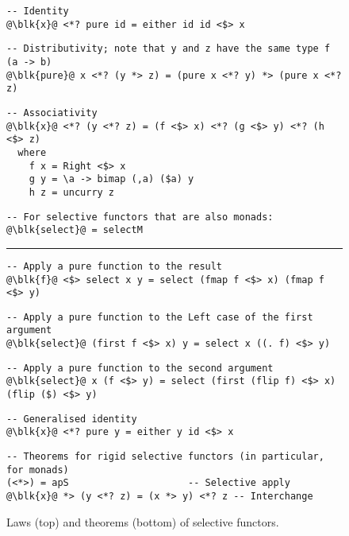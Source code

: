 {\begin{figure}
\begin{verbatim}
-- Identity
@\blk{x}@ <*? pure id = either id id <$> x
\end{verbatim}
\vspace{1mm}
\begin{verbatim}
-- Distributivity; note that y and z have the same type f (a -> b)
@\blk{pure}@ x <*? (y *> z) = (pure x <*? y) *> (pure x <*? z)
\end{verbatim}
\vspace{1mm}
\begin{verbatim}
-- Associativity
@\blk{x}@ <*? (y <*? z) = (f <$> x) <*? (g <$> y) <*? (h <$> z)
  where
    f x = Right <$> x
    g y = \a -> bimap (,a) ($a) y
    h z = uncurry z
\end{verbatim}
\vspace{1mm}
\begin{verbatim}
-- For selective functors that are also monads:
@\blk{select}@ = selectM
\end{verbatim}
\vspace{2mm}
\hrule
\vspace{2mm}
\begin{verbatim}
-- Apply a pure function to the result
@\blk{f}@ <$> select x y = select (fmap f <$> x) (fmap f <$> y)
\end{verbatim}
\vspace{1mm}
\begin{verbatim}
-- Apply a pure function to the Left case of the first argument
@\blk{select}@ (first f <$> x) y = select x ((. f) <$> y)
\end{verbatim}
\vspace{1mm}
\begin{verbatim}
-- Apply a pure function to the second argument
@\blk{select}@ x (f <$> y) = select (first (flip f) <$> x) (flip ($) <$> y)
\end{verbatim}
\vspace{1mm}
\begin{verbatim}
-- Generalised identity
@\blk{x}@ <*? pure y = either y id <$> x
\end{verbatim}
\vspace{1mm}
\begin{verbatim}
-- Theorems for rigid selective functors (in particular, for monads)
(<*>) = apS                     -- Selective apply
@\blk{x}@ *> (y <*? z) = (x *> y) <*? z -- Interchange
\end{verbatim}
\caption{Laws (top) and theorems (bottom) of selective functors.}
\label{fig-laws}
\end{figure}

}
